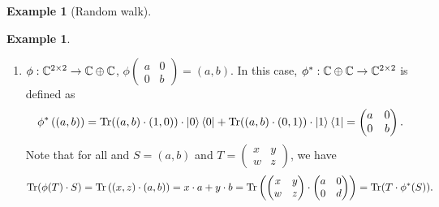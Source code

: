 \documentclass[10pt,a4paper]{amsart}
\theoremstyle{definition}
\theoremstyle{definition}
\newtheorem{example}[definition]{Example}
\theoremstyle{definition}
\theoremstyle{definition}
\theoremstyle{definition}
\theoremstyle{definition}
\begin{document}
\begin{example}[Random walk]
\begin{example}
\begin{enumerate}
    \item $\phi: \mathbb{C}^{2 \times 2} \to  \mathbb{C} \oplus \mathbb{C} $, $\phi\left(\begin{smallmatrix}
    a & 0 \\
    0 & b
  \end{smallmatrix}\right) = (a,b).$  In this case, $\phi^*: \mathbb{C} \oplus \mathbb{C} \to \mathbb{C}^{2 \times 2}  $ is defined as
    $$\phi^*\left( (a,b)\right) 
    = \text{Tr} ((a,b) \cdot (1,0)) \cdot \ket{0}\bra{0} + \text{Tr} ((a,b) \cdot (0,1)) \cdot \ket{1}\bra{1}
    = \begin{pmatrix}
    a & 0 \\
    0 & b
    \end{pmatrix}.$$
    Note that for all and $S = (a,b)$ and $T= \left(\begin{smallmatrix}
    x & y \\
    w & z
  \end{smallmatrix}\right)$, we have 
    $$\text{Tr}(\phi(T)\cdot S) = \text{Tr}\left( (x,z) \cdot (a,b)\right) = x\cdot a + y\cdot b =  \text{Tr}\left(\begin{pmatrix}
    x & y \\
    w & z
    \end{pmatrix}\cdot \begin{pmatrix}
    a & 0 \\
    0 & d
    \end{pmatrix}\right)  = \text{Tr}(T\cdot \phi^*(S)). $$
    

\end{enumerate}
\end{example}
\end{example}
\end{document}
